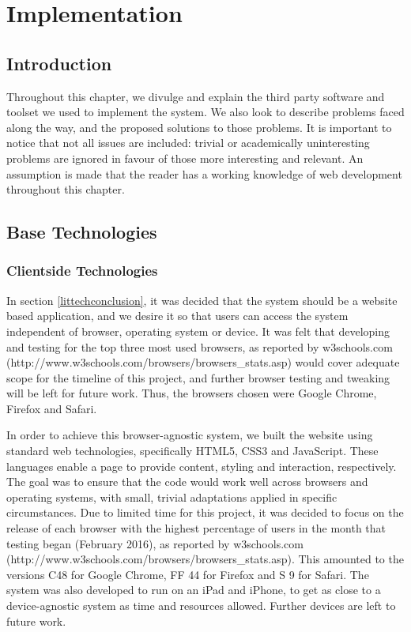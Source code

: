 \chapter{Implementation}


\section{Introduction}
Throughout this chapter, we divulge and explain the third party software and toolset we used to implement the system.
We also look to describe problems faced along the way, and the proposed solutions to those problems. 
It is important to notice that not all issues are included: trivial or academically uninteresting problems are ignored in favour of those more interesting and relevant. 
An assumption is made that the reader has a working knowledge of web development throughout this chapter.


\section{Base Technologies}
\subsection{Clientside Technologies}
In section \ref{littechconclusion}, it was decided that the system should be a website based application, and we desire it so that users can access the system independent of browser, operating system or device.
It was felt that developing and testing for the top three most used browsers, as reported by w3schools.com (http://www.w3schools.com/browsers/browsers\_stats.asp) would cover adequate scope for the timeline of this project, and further browser testing and tweaking will be left for future work. 
Thus, the browsers chosen were Google Chrome, Firefox and Safari.

In order to achieve this browser-agnostic system, we built the website using standard web technologies, specifically HTML5, CSS3 and JavaScript.
These languages enable a page to provide content, styling and interaction, respectively.
The goal was to ensure that the code would work well across browsers and operating systems, with small, trivial adaptations applied in specific circumstances.
Due to limited time for this project, it was decided to focus on the release of each browser with the highest percentage of users in the month that testing began (February 2016), as reported by w3schools.com (http://www.w3schools.com/browsers/browsers\_stats.asp). 
This amounted to the versions C48 for Google Chrome, FF 44 for Firefox and S 9 for Safari.
The system was also developed to run on an iPad and iPhone, to get as close to a device-agnostic system as time and resources allowed. Further devices are left to future work.

